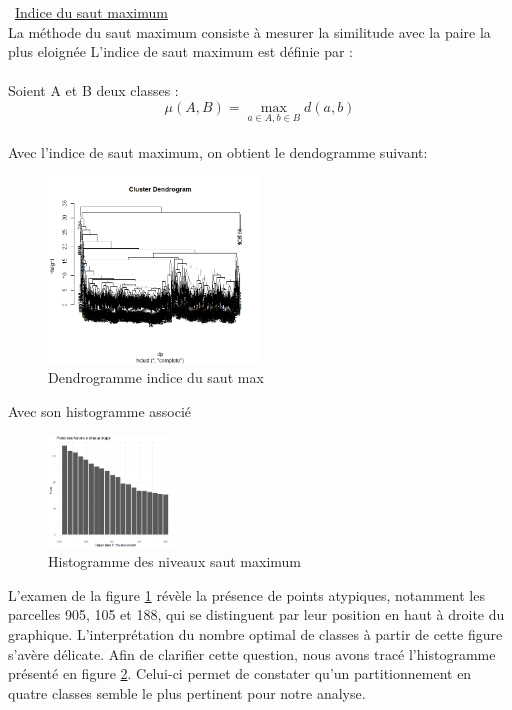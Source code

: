 \documentclass{article}
\begin{document}
\textbullet\ \underline{Indice du saut maximum}
\\
La méthode du saut maximum consiste à mesurer la similitude avec la paire la plus eloignée
L'indice de saut maximum est définie par :
\\
\\
Soient A et B deux classes :
\[
\mu(A,B) = \max_{a \in A , b \in B} d(a,b)
\]
\\
Avec l'indice de saut maximum, on obtient le dendogramme suivant:
\\
\begin{figure}[H]
    \centering
    \includegraphics[width=0.5\textwidth]{dendromax4.png}
    \caption{Dendrogramme  indice du saut max}
    \label{fig:dendmax} 
\end{figure}
Avec son histogramme associé
\\
\begin{figure}[H]
    \centering
    \includegraphics[width=0.3\textwidth]{histomax4.png}
    \caption{Histogramme des niveaux saut maximum}
    \label{fig:histomax} 
\end{figure}
L'examen de la figure \ref{fig:dendmax} révèle la présence de points atypiques, notamment les parcelles 905, 105 et 188, qui se distinguent par leur position en haut à droite du graphique. L'interprétation du nombre optimal de classes à partir de cette figure s'avère délicate. Afin de clarifier cette question, nous avons tracé l'histogramme présenté en figure \ref{fig:histomax}. Celui-ci permet de constater qu'un partitionnement en quatre classes semble le plus pertinent pour notre analyse.
\\\\
\end{document}
